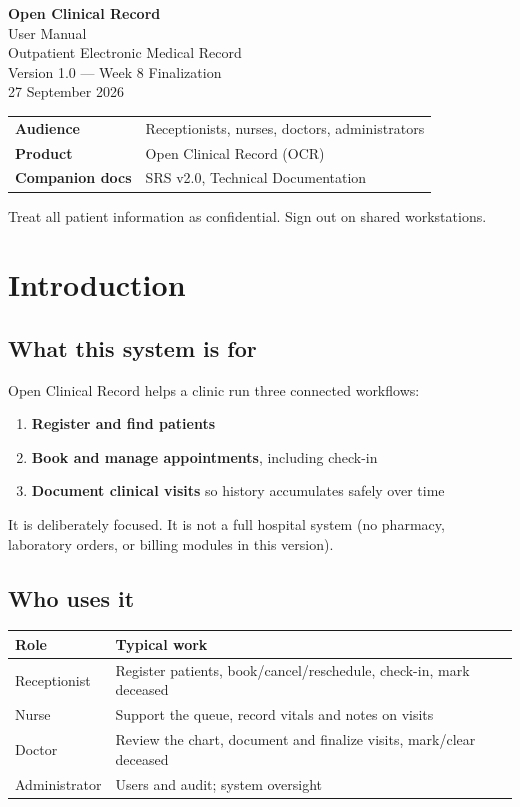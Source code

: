 \documentclass[11pt,a4paper]{article}
\begin{document}
\begin{titlepage}
\centering
\vspace*{1.5cm}
{\LARGE\bfseries Open Clinical Record}\\[0.4cm]
{\Large User Manual}\\[1.0cm]
{\large Outpatient Electronic Medical Record}\\[0.4cm]
{\large Version 1.0 --- Week 8 Finalization}\\[0.4cm]
{\large 27 September 2026}\\[1.5cm]
\begin{tabular}{ll}
\toprule
\textbf{Audience} & Receptionists, nurses, doctors, administrators \\
\textbf{Product} & Open Clinical Record (OCR) \\
\textbf{Companion docs} & SRS v2.0, Technical Documentation \\
\bottomrule
\end{tabular}
\vfill
{\small Treat all patient information as confidential. Sign out on shared workstations.}
\end{titlepage}

\tableofcontents
\newpage

\section{Introduction}

\subsection{What this system is for}
Open Clinical Record helps a clinic run three connected workflows:
\begin{enumerate}
  \item \textbf{Register and find patients}
  \item \textbf{Book and manage appointments}, including check-in
  \item \textbf{Document clinical visits} so history accumulates safely over time
\end{enumerate}
It is deliberately focused. It is not a full hospital system (no pharmacy, laboratory orders, or billing modules in this version).

\subsection{Who uses it}
\begin{tabularx}{\textwidth}{@{}p{3.6cm}X@{}}
\toprule
\textbf{Role} & \textbf{Typical work} \\
\midrule
Receptionist & Register patients, book/cancel/reschedule, check-in, mark deceased \\
Nurse & Support the queue, record vitals and notes on visits \\
Doctor & Review the chart, document and finalize visits, mark/clear deceased \\
Administrator & Users and audit; system oversight \\
\bottomrule
\end{tabularx}
\end{document}
